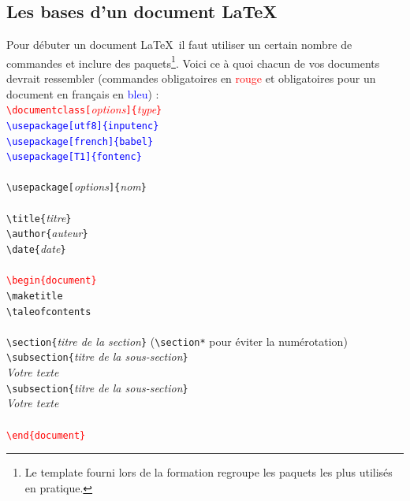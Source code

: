 \documentclass[11pt]{article}				%
\newcommand{\tb}{\textbackslash}
\newcommand{\cmdo}[3][]{\texttt{\textbackslash #2}\texttt{[#1}\texttt{]\{#3\}}}
\newcommand{\cmdoi}[3][]{\texttt{\textbackslash #2}\texttt{[}\textit{#1}\texttt{]\{}\textit{#3}\texttt{\}}}
\newcommand{\cmd}[2]{\texttt{\textbackslash #1}\texttt{\{#2\}}}
\newcommand{\cmdi}[2]{\texttt{\textbackslash #1}\texttt{\{}\textit{#2}\texttt{\}}}
\begin{document}
\clearpage

\subsection{Les bases d'un document \LaTeX}


\noindent Pour débuter un document \LaTeX \ il faut utiliser un certain nombre de commandes et inclure des paquets\footnote{Le template fourni lors de la formation regroupe les paquets les plus utilisés en pratique.}. Voici ce à quoi chacun de vos documents devrait ressembler (commandes obligatoires en \textcolor{red}{rouge} et obligatoires pour un document en français en \textcolor{blue}{bleu}) : \\

\noindent
\textcolor{red}{\cmdoi[options]{documentclass}{type}} \\
\textcolor{blue}{\cmdo[utf8]{usepackage}{inputenc}} \\
\textcolor{blue}{\cmdo[french]{usepackage}{babel}} \\
\textcolor{blue}{\cmdo[T1]{usepackage}{fontenc}} \\
~\\
\cmdoi[options]{usepackage}{nom} \\
~\\ 
\cmdi{title}{titre} \\
\cmdi{author}{auteur} \\
\cmdi{date}{date} \\
~\\ 
\textcolor{red}{\cmd{begin}{document}}\\
\texttt{\tb maketitle} \\
\texttt{\tb taleofcontents} \\
~\\
\cmdi{section}{titre de la section} \quad (\texttt{\tb section*} pour éviter la numérotation)	 \\
\cmdi{subsection}{titre de la sous-section} \\
\textit{Votre texte}\\

\cmdi{subsection}{titre de la sous-section} \\
\textit{Votre texte} \\
~\\
\textcolor{red}{\texttt{\tb end\{document\}}} \\
\end{document}
